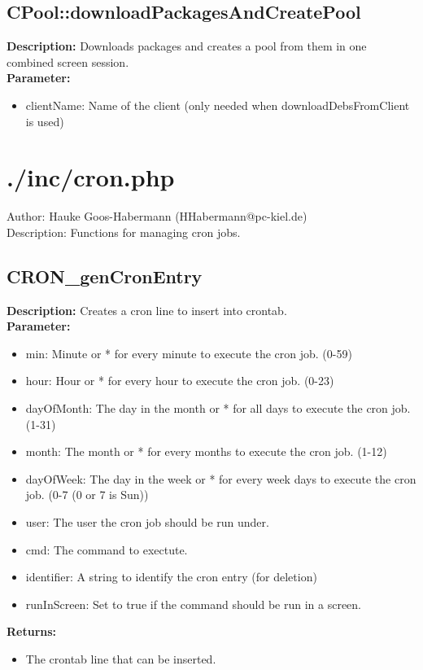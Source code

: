 \subsection{CPool::downloadPackagesAndCreatePool}
\textbf{Description:} Downloads packages and creates a pool from them in one combined screen session.\\
\textbf{Parameter:}
\begin{itemize}
\item clientName: Name of the client (only needed when downloadDebsFromClient is used)
\end{itemize}

\newpage\section{./inc/cron.php}
 Author: Hauke Goos-Habermann (HHabermann@pc-kiel.de)\\
 Description: Functions for managing cron jobs.\\

\subsection{CRON\_genCronEntry}
\textbf{Description:} Creates a cron line to insert into crontab.\\
\textbf{Parameter:}
\begin{itemize}
\item min: Minute or * for every minute to execute the cron job. (0-59)
\item hour: Hour or * for every hour to execute the cron job. (0-23)
\item dayOfMonth: The day in the month or * for all days to execute the cron job. (1-31)
\item month: The month or * for every months to execute the cron job. (1-12)
\item dayOfWeek: The day in the week or * for every week days to execute the cron job. (0-7 (0 or 7 is Sun))
\item user: The user the cron job should be run under.
\item cmd: The command to exectute.
\item identifier: A string to identify the cron entry (for deletion)
\item runInScreen: Set to true if the command should be run in a screen.
\end{itemize}
\textbf{Returns:}
\begin{itemize}
\item The crontab line that can be inserted.
\end{itemize}

